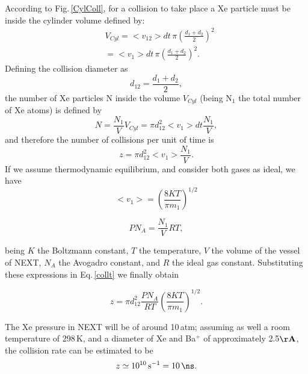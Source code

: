 According to Fig.\,\ref{CylColl}, for a collision to take place a Xe particle must be inside the cylinder volume defined by:
\begin{align}
& V_{Cyl}=<v_{12}> dt \, \pi \left(\frac{d_1+d_2}{2}\right)^2 \\ \nonumber
& =<v_1> dt \, \pi \left(\frac{d_1+d_2}{2}\right)^2.
\end{align} 
Defining the collision diameter as 
\begin{equation}
d_{12}=\frac{d_1+d_2}{2},
\end{equation}
the number of Xe particles N inside the volume $V_{Cyl}$ (being N$_1$ the total number of Xe atoms) is defined by
\begin{equation}
N=\frac{N_1}{V}V_{Cyl}=\pi d_{12}^2 <v_{1}> dt \frac{N_1}{V},
\end{equation}
and therefore the number of collisions per unit of time is
\begin{equation}
\label{collt}
z=\pi d_{12}^2 <v_{1}>\frac{N_1}{V}.
\end{equation}
If we assume thermodynamic equilibrium, and consider both gases as ideal, we have
\begin{equation}
<v_1>=\left(\frac{8KT}{\pi m_1}\right)^{1/2}
\end{equation}

\begin{equation}
PN_{A}=\frac{N_1}{V}RT,
\end{equation}

being $K$ the Boltzmann constant, $T$ the temperature, $V$ the volume of the vessel of NEXT, $N_A$ the Avogadro constant, and $R$ the ideal gas constant. Substituting these expressions in Eq.\,\ref{collt} we finally obtain

\begin{equation}
\label{collt_2}
z=\pi d_{12}^2  \frac{PN_A}{R T}\left(\frac{8KT}{\pi m_1}\right)^{1/2}.
\end{equation}

The Xe pressure in NEXT will be of around 10\,atm; assuming as well a room temperature of 298\,K, and a diameter of Xe and Ba$^+$ of approximately 2.5$\mathbf{\AA}$, the collision rate can be estimated to be 
\begin{equation}
\label{coll_rate}
z\simeq10^{10}\,\text{s}^{-1}=10\,\text{\ns}.
\end{equation}
 
